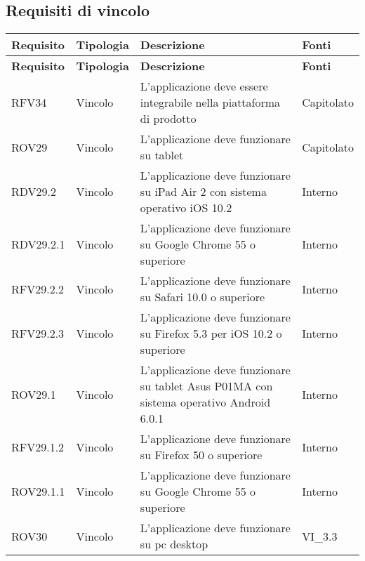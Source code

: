 \subsection{Requisiti di vincolo}
\def\arraystretch{1.5}
\begin{longtable}{p{2cm}!{\VRule[1pt]}p{2cm}!{\VRule[1pt]}p{5cm}!{\VRule[1pt]}p{1.5cm}}
	\color{white} \textbf{Requisito} & \color{white} \textbf{Tipologia} & \color{white} \textbf{Descrizione} & \color{white} \textbf{Fonti} \\ 
	\endfirsthead 
	\color{white} \textbf{Requisito} & \color{white} \textbf{Tipologia} & \color{white} \textbf{Descrizione} & \color{white} \textbf{Fonti} \\ 
	\endhead 
	RFV34&Vincolo\newline  & L'applicazione deve essere integrabile nella piattaforma di prodotto & Capitolato \\
	ROV29&Vincolo\newline  & L'applicazione deve funzionare su tablet & Capitolato \\
	RDV29.2&Vincolo\newline  & L'applicazione deve funzionare su iPad Air 2 con sistema operativo iOS 10.2 & Interno \\
	RDV29.2.1&Vincolo\newline  & L'applicazione deve funzionare su Google Chrome 55 o superiore & Interno \\
	RFV29.2.2&Vincolo\newline  & L'applicazione deve funzionare su Safari 10.0 o superiore & Interno \\
	RFV29.2.3&Vincolo\newline  & L'applicazione deve funzionare su Firefox 5.3 per iOS 10.2 o superiore & Interno \\
	ROV29.1&Vincolo\newline  & L'applicazione deve funzionare su tablet Asus P01MA con sistema operativo Android 6.0.1 & Interno \\
	RFV29.1.2&Vincolo\newline  & L'applicazione deve funzionare su Firefox 50 o superiore & Interno \\
	ROV29.1.1&Vincolo\newline  & L'applicazione deve funzionare su Google Chrome 55 o superiore & Interno \\
	ROV30&Vincolo\newline  & L'applicazione deve funzionare su pc desktop & VI_3.3 \\

\end{longtable}

